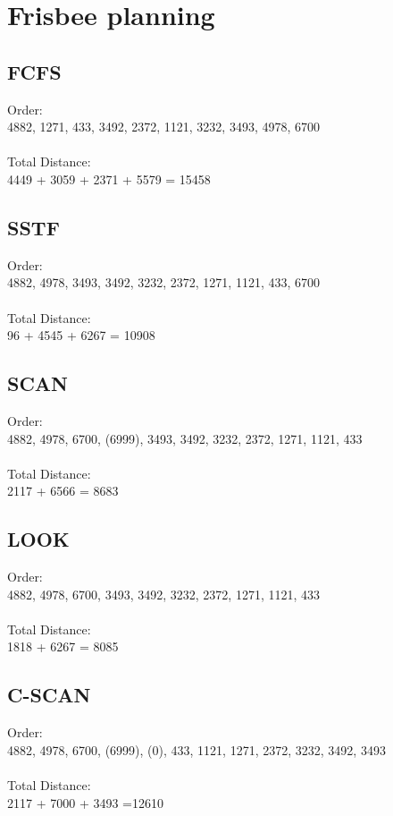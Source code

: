\documentclass[a4paper, 11pt]{article}
\begin{document}
        \section{Frisbee planning}
        \subsection{FCFS}
        Order: \\
        4882, 1271, 433, 3492, 2372, 1121, 3232, 3493, 4978, 6700\\\\
        Total Distance: \\
        4449 + 3059 + 2371 + 5579 = 15458
        \subsection{SSTF}
        Order:\\
        4882, 4978, 3493, 3492, 3232, 2372, 1271, 1121, 433, 6700 \\\\
        Total Distance:\\
        96 + 4545 + 6267 = 10908
        \subsection{SCAN}
        Order: \\
        4882, 4978, 6700, (6999), 3493, 3492, 3232, 2372, 1271, 1121, 433 \\\\
        Total Distance: \\
        2117 + 6566 = 8683
        \subsection{LOOK}
        Order: \\
        4882, 4978, 6700, 3493, 3492, 3232, 2372, 1271, 1121, 433 \\\\
        Total Distance: \\
        1818 + 6267 = 8085
        \newpage
        \subsection{C-SCAN}
        Order: \\
        4882, 4978, 6700, (6999), (0), 433, 1121, 1271, 2372, 3232, 3492, 3493 \\\\
        Total Distance: \\
        2117 + 7000 + 3493 =12610
\end{document}
